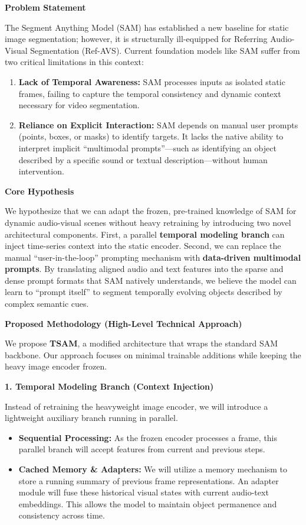 \noindent\textbf{Problem Statement}

The Segment Anything Model (SAM) has established a new baseline for static image segmentation; however, it is structurally ill-equipped for Referring Audio-Visual Segmentation (Ref-AVS). Current foundation models like SAM suffer from two critical limitations in this context:

\begin{enumerate}
    \item \textbf{Lack of Temporal Awareness:} SAM processes inputs as isolated static frames, failing to capture the temporal consistency and dynamic context necessary for video segmentation.
    \item \textbf{Reliance on Explicit Interaction:} SAM depends on manual user prompts (points, boxes, or masks) to identify targets. It lacks the native ability to interpret implicit ``multimodal prompts''---such as identifying an object described by a specific sound or textual description---without human intervention.
\end{enumerate}

\vspace{1em}
\noindent\textbf{Core Hypothesis}

We hypothesize that we can adapt the frozen, pre-trained knowledge of SAM for dynamic audio-visual scenes without heavy retraining by introducing two novel architectural components. First, a parallel \textbf{temporal modeling branch} can inject time-series context into the static encoder. Second, we can replace the manual ``user-in-the-loop'' prompting mechanism with \textbf{data-driven multimodal prompts}. By translating aligned audio and text features into the sparse and dense prompt formats that SAM natively understands, we believe the model can learn to ``prompt itself'' to segment temporally evolving objects described by complex semantic cues.

\vspace{1em}
\noindent\textbf{Proposed Methodology (High-Level Technical Approach)}

We propose \textbf{TSAM}, a modified architecture that wraps the standard SAM backbone. Our approach focuses on minimal trainable additions while keeping the heavy image encoder frozen.

\vspace{0.5em}
\noindent\textbf{1. Temporal Modeling Branch (Context Injection)}

Instead of retraining the heavyweight image encoder, we will introduce a lightweight auxiliary branch running in parallel.
\begin{itemize}
    \item \textbf{Sequential Processing:} As the frozen encoder processes a frame, this parallel branch will accept features from current and previous steps.
    \item \textbf{Cached Memory \& Adapters:} We will utilize a memory mechanism to store a running summary of previous frame representations. An adapter module will fuse these historical visual states with current audio-text embeddings. This allows the model to maintain object permanence and consistency across time.
\end{itemize}

